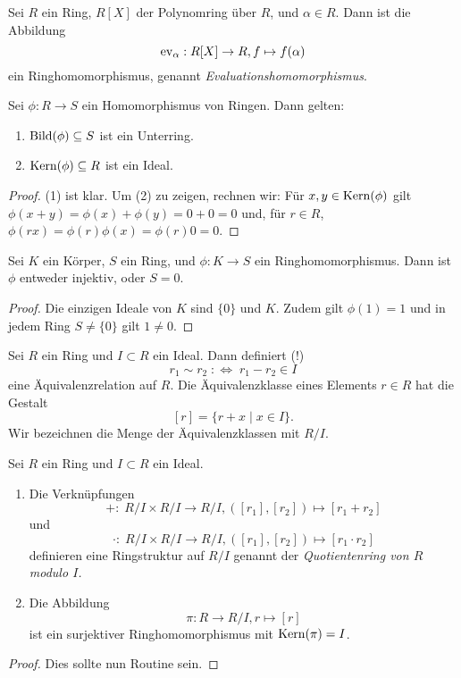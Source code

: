 \documentclass{book}
\begin{document}
\begin{exa}
    \label{exa:evaluation}
    Sei $R$ ein Ring, $R[X]$ der Polynomring über $R$, und $\alpha \in R$. Dann ist die Abbildung
    \[
        \operatorname{ev}_{\alpha}: R[X] \to R, f \mapsto f(\alpha)
    \]
    ein Ringhomomorphismus, genannt \emph{Evaluationshomomorphismus}.
\end{exa}

\begin{prop}
    \label{prop:kern}
    Sei $\phi: R \to S$ ein Homomorphismus von Ringen. Dann gelten:
    \begin{enumerate}
        \item $\Bild(\phi) \subset S$ ist ein Unterring. 
        \item $\Kern(\phi) \subset R$ ist ein Ideal.
    \end{enumerate}
\end{prop}
\begin{proof}
    (1) ist klar. Um (2) zu zeigen, rechnen wir: Für $x,y \in \Kern(\phi)$ gilt
    $\phi(x+y) = \phi(x) + \phi(y) = 0 + 0 = 0$ und, für $r \in R$, $\phi(rx) =
    \phi(r)\phi(x) = \phi(r) 0 = 0$.
\end{proof}

\begin{cor}
    \label{cor:fieldring}
    Sei $K$ ein Körper, $S$ ein Ring, und $\phi: K \to S$ ein Ringhomomorphismus. Dann ist $\phi$ entweder injektiv, oder $S = 0$. 
\end{cor}
\begin{proof}
    Die einzigen Ideale von $K$ sind $\{0\}$ und $K$. Zudem gilt $\phi(1) = 1$
    und in jedem Ring $S \ne \{0\}$ gilt $1 \ne 0$. 
\end{proof}

Sei $R$ ein Ring und $I \subset R$ ein Ideal. Dann definiert (!) 
\[
    r_1 \sim r_2 \; : \Leftrightarrow\; r_1 - r_2 \in I
\]
eine Äquivalenzrelation auf $R$. Die Äquivalenzklasse eines Elements $r \in R$
hat die Gestalt
\[
    [r] = \{r + x \;|\; x \in I\}.
\]
Wir bezeichnen die Menge der Äquivalenzklassen mit $R/I$. 

\begin{prop}
    \label{prop:quot} Sei $R$ ein Ring und $I \subset R$ ein Ideal.
    \begin{enumerate}
        \item Die Verknüpfungen 
            \[
                +: \; R/I \times R/I \to R/I, ([r_1],[r_2]) \mapsto [r_1+r_2]
            \]
            und
            \[
                \cdot: \; R/I \times R/I \to R/I, ([r_1],[r_2]) \mapsto [r_1 \cdot r_2]
            \]
            definieren eine Ringstruktur auf $R/I$ genannt der \emph{Quotientenring von
            $R$ modulo $I$.} 
        \item Die Abbildung 
            \[
                \pi: R \to R/I, r \mapsto [r]
            \]
            ist ein surjektiver Ringhomomorphismus mit $\operatorname{Kern}(\pi) = I$. 
    \end{enumerate}
\end{prop}
\begin{proof}
   Dies sollte nun Routine sein. 
\end{proof}
\end{document}

